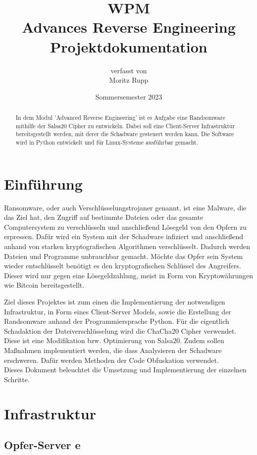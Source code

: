 \documentclass[12pt]{article}
\title{\small{WPM}\\\vspace{3mm}\Large{Advances Reverse Engineering\\\small{Projektdokumentation}}}
\author{ \small{verfasst von}\\ Moritz Rupp}
\date{Sommersemester 2023}
\begin{document}
\maketitle
\newpage
\tableofcontents
\newpage

\begin{abstract}
\noindent In dem Modul 'Advanced Reverse Engineering' ist es Aufgabe eine Randsomware mithilfe der Salsa20 Cipher zu entwickeln. Dabei soll eine Client-Server Infrastruktur bereitsgestellt werden, mit derer die Schadware gesteuert werden kann. Die Software wird in Python entwickelt und für Linux-Systeme ausführbar gemacht.
\end{abstract}
\section{Einführung}
Ransomware, oder auch Verschlüsselungstrojaner genannt, ist eine Malware, die das Ziel hat, den Zugriff auf bestimmte Dateien oder das gesamte Computersystem  zu verschlüsseln und anschließend Lösegeld von den Opfern zu erpressen. Dafür wird ein System mit der Schadware infiziert und anschließend anhand von starken kryptografischen Algorithmen verschlüsselt. Dadurch werden Dateien und Programme unbrauchbar gemacht. Möchte das Opfer sein System wieder entschlüsselt benötigt es den kryptografischen Schlüssel des Angreifers. Dieser wird nur gegen eine Lösegeldzahlung, meist in Form von Kryptowährungen wie Bitcoin bereitsgestellt. 
\newline


Ziel dieses Projektes ist zum einen die Implementierung der notwendigen Infrastruktur, in Form eines Client-Server Models, sowie die Erstellung der Randsomware anhand der Programmiersprache Python.
Für die eigentlich Schadaktion der Dateiverschlüsselung wird die ChaCha20 Cipher verwendet. Diese ist eine Modifikation bzw. Optimierung von Salsa20.
Zudem sollen Maßnahmen implementiert werden, die dass Analysieren der Schadware erschweren. Dafür werden Methoden der Code Obfuskation verwendet.\\
Dieses Dokument beleuchtet die Umsetzung und Implementierung der einzelnen Schritte.

\newpage
\section{Infrastruktur}
\subsection{Opfer-Server
	e
}
																					
\end{document}
